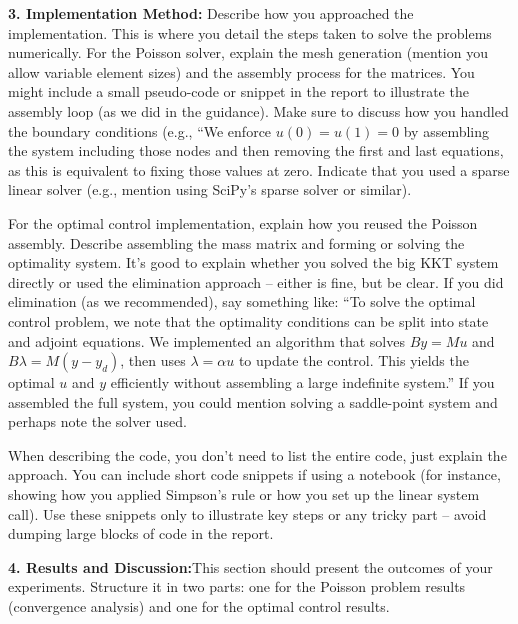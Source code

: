 \documentclass[a4paper,10pt]{article}
\begin{document}
\textbf{3. Implementation Method:}
Describe how you approached the implementation. This is where you detail the steps taken to solve the problems numerically. For the Poisson solver, explain the mesh generation (mention you allow variable element sizes) and the assembly process for the matrices. You might include a small pseudo-code or snippet in the report to illustrate the assembly loop (as we did in the guidance). Make sure to discuss how you handled the boundary conditions (e.g., “We enforce \(u(0)=u(1)=0\) by assembling the system including those nodes and then removing the first and last equations, as this is equivalent to fixing those values at zero.
Indicate that you used a sparse linear solver (e.g., mention using SciPy's sparse solver or similar).

For the optimal control implementation, explain how you reused the Poisson assembly. Describe assembling the mass matrix and forming or solving the optimality system. It's good to explain whether you solved the big KKT system directly or used the elimination approach – either is fine, but be clear. If you did elimination (as we recommended), say something like: “To solve the optimal control problem, we note that the optimality conditions can be split into state and adjoint equations. We implemented an algorithm that solves \(B y = M u\) and \(B \lambda = M(y - y_d)\), then uses \(\lambda = \alpha u\) to update the control. This yields the optimal \(u\) and \(y\) efficiently without assembling a large indefinite system.” If you assembled the full system, you could mention solving a saddle-point system and perhaps note the solver used.

When describing the code, you don't need to list the entire code, just explain the approach. You can include short code snippets if using a notebook (for instance, showing how you applied Simpson's rule or how you set up the linear system call). Use these snippets only to illustrate key steps or any tricky part – avoid dumping large blocks of code in the report.

\textbf{4. Results and Discussion:}This section should present the outcomes of your experiments. Structure it in two parts: one for the Poisson problem results (convergence analysis) and one for the optimal control results.
\end{document}
